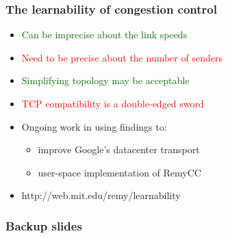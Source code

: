 \documentclass[svgnames]{beamer}
\begin{document}
\begin{Large}
\begin{frame}
\frametitle{The learnability of congestion control}
\noindent
\begin{itemize}
\item<2-> \textcolor{darkgreen}{Can be imprecise about the link speeds}
\item<3-> \textcolor{red}{Need to be precise about the number of senders}
\item<4-> \textcolor{darkgreen}{Simplifying topology may be acceptable}
\item<5-> \textcolor{red}{TCP compatibility is a double-edged sword}
\item<6-> Ongoing work in using findings to:
\begin{itemize}
\item<2-> improve Google's datacenter transport
\item<3-> user-space implementation of RemyCC
\end{itemize}
\item<7-> http://web.mit.edu/remy/learnability
\end{itemize}
\end{frame}

\end{Large}

\begin{frame}
\frametitle{Backup slides}
\end{frame}







\end{document}
